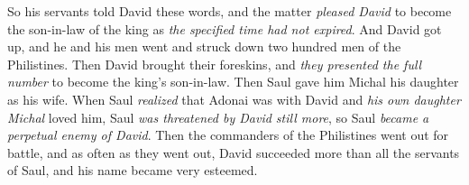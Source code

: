 \begin{biblechapter}
\verse So his servants told David these words, and the matter \textit{pleased David} to become the son-in-law of the king as \textit{the specified time had not expired}.
\verse And David got up, and he and his men went and struck down two hundred men of the Philistines. Then David brought their foreskins, and \textit{they presented the full number} to become the king’s son-in-law. Then Saul gave him Michal his daughter as his wife.
\verse When Saul \textit{realized} that Adonai was with David and \textit{his own daughter Michal} loved him,
\verse Saul \textit{was threatened by David still more}, so Saul \textit{became a perpetual enemy of David}.
\verse Then the commanders of the Philistines went out for battle, and as often as they went out, David succeeded more than all the servants of Saul, and his name became very esteemed.
\end{biblechapter}

